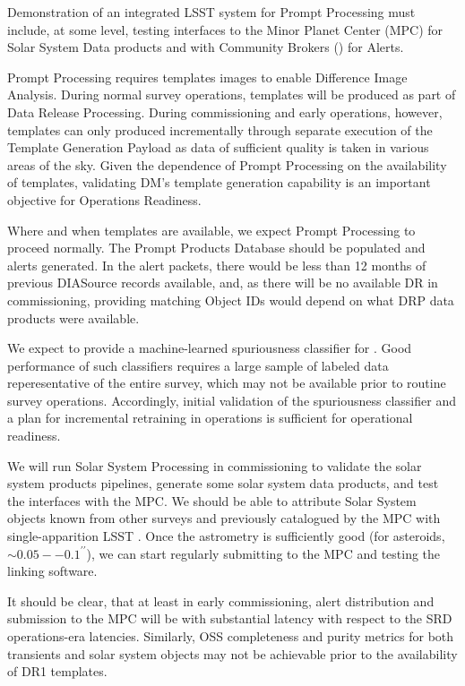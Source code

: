 Demonstration of an integrated LSST system for Prompt Processing must include, at some level, testing interfaces to the Minor Planet Center (MPC) for Solar System Data products and with Community Brokers () for Alerts. 

Prompt Processing requires templates images to enable Difference Image Analysis.
During normal survey operations, templates will be produced as part of Data Release Processing.
During commissioning and early operations, however, templates can only produced incrementally through separate execution of the Template Generation Payload as data of sufficient quality is taken in various areas of the sky.  
Given the dependence of Prompt Processing on the availability of templates, validating DM's template generation capability is an important objective for Operations Readiness.

Where and when templates are available, we expect Prompt Processing to proceed normally.
The Prompt Products Database should be populated and alerts generated.  
In the alert packets, there would be less than 12 months of previous DIASource records available, and, as there will be no available DR in commissioning, providing matching Object IDs would depend on what DRP data products were available. 

We expect to provide a machine-learned spuriousness classifier for \DIASources.
Good performance of such classifiers requires a large sample of labeled data reperesentative of the entire survey, which may not be available prior to routine survey operations.
Accordingly, initial validation of the spuriousness classifier and a plan for incremental retraining in operations is sufficient for operational readiness.

We will run Solar System Processing in commissioning to validate the solar system products pipelines, generate some solar system data products, and test the interfaces with the MPC. 
We should be able to attribute Solar System objects known from other surveys and previously catalogued by the MPC with single-apparition LSST \DIASources.
Once the astrometry is sufficiently good (for asteroids,  $\sim0.05--0.1^{\prime\prime}$), we can start regularly submitting to the MPC and testing the linking software. 

It should be clear, that at least in early commissioning, alert distribution and submission to the MPC will be with substantial latency with respect to the SRD operations-era latencies.  
Similarly, OSS completeness and purity metrics for both transients and solar system objects may not be achievable prior to the availability of DR1 templates.

